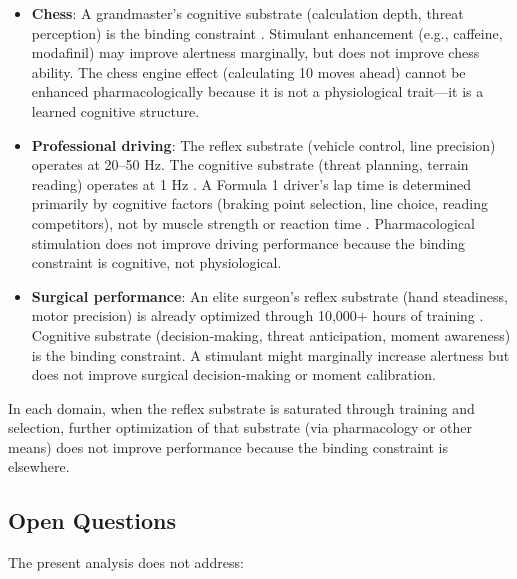 \documentclass[11pt,twocolumn]{article}
\theoremstyle{definition}
\theoremstyle{remark}
\begin{document}
\begin{itemize}[leftmargin=1.2em]
\item \textbf{Chess}: A grandmaster's cognitive substrate (calculation depth, threat perception) is the binding constraint \cite{kahneman2011thinking}. Stimulant enhancement (e.g., caffeine, modafinil) may improve alertness marginally, but does not improve chess ability. The chess engine effect (calculating 10 moves ahead) cannot be enhanced pharmacologically because it is not a physiological trait—it is a learned cognitive structure.

\item \textbf{Professional driving}: The reflex substrate (vehicle control, line precision) operates at 20--50 Hz. The cognitive substrate (threat planning, terrain reading) operates at 1 Hz \cite{kelly2008controlvehicle,limebeer2015optimal}. A Formula 1 driver's lap time is determined primarily by cognitive factors (braking point selection, line choice, reading competitors), not by muscle strength or reaction time \cite{milliken1995race,wright2001formula}. Pharmacological stimulation does not improve driving performance because the binding constraint is cognitive, not physiological.

\item \textbf{Surgical performance}: An elite surgeon's reflex substrate (hand steadiness, motor precision) is already optimized through 10,000+ hours of training \cite{schmidt2019motor}. Cognitive substrate (decision-making, threat anticipation, moment awareness) is the binding constraint. A stimulant might marginally increase alertness but does not improve surgical decision-making or moment calibration.
\end{itemize}

In each domain, when the reflex substrate is saturated through training and selection, further optimization of that substrate (via pharmacology or other means) does not improve performance because the binding constraint is elsewhere.

\subsection{Open Questions}

The present analysis does not address:
\end{document}
